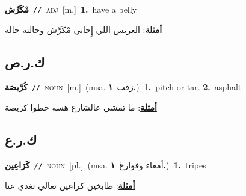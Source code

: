 \documentclass[10pt,a4paper,twoside]{article} %
\begin{document}
\begin{multicols}{2}
{\setlength\topsep{0pt}\textbf{\foreignlanguage{arabic}{مْكَرِّش}}\ {\color{gray}\texttt{//}\color{black}}\ \textsc{adj}\ [m.]\ \textbf{1.}~have a belly\  \begin{flushright}\color{gray}\foreignlanguage{arabic}{\textbf{\underline{\foreignlanguage{arabic}{أمثلة}}}: العريس اللي إِجاني مْكَرِّش وحالته حالة}\end{flushright}\color{black}} \vspace{2mm}

\vspace{-3mm}
\subsection*{\color{blue}\foreignlanguage{arabic}{ك.ر.ص}\color{blue}{ (ntws)}} 

{\setlength\topsep{0pt}\textbf{\foreignlanguage{arabic}{كُرَّيصَة}}\ {\color{gray}\texttt{//}\color{black}}\ \textsc{noun}\ [m.]\ \color{gray}(msa. \foreignlanguage{arabic}{زفت}~\foreignlanguage{arabic}{\textbf{١.}})\color{black}\ \textbf{1.}~pitch or tar.  \textbf{2.}~asphalt\  \begin{flushright}\color{gray}\foreignlanguage{arabic}{\textbf{\underline{\foreignlanguage{arabic}{أمثلة}}}: ما تمشي عالشارع هسه حطوا كريصة}\end{flushright}\color{black}} \vspace{2mm}

\vspace{-3mm}
\subsection*{\color{blue}\foreignlanguage{arabic}{ك.ر.ع}\color{blue}{}} 

{\setlength\topsep{0pt}\textbf{\foreignlanguage{arabic}{كَرَاعِين}}\ {\color{gray}\texttt{//}\color{black}}\ \textsc{noun}\ [pl.]\ \color{gray}(msa. \foreignlanguage{arabic}{أمعاء وفوارغ}~\foreignlanguage{arabic}{\textbf{١.}})\color{black}\ \textbf{1.}~tripes\  \begin{flushright}\color{gray}\foreignlanguage{arabic}{\textbf{\underline{\foreignlanguage{arabic}{أمثلة}}}: طابخين كراعين تعالي تغدي عنا}\end{flushright}\color{black}} \vspace{2mm}


\end{multicols}
\end{document}
